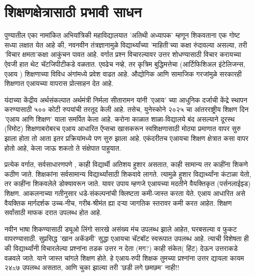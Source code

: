 \chapter{शिक्षणक्षेत्रासाठी प्रभावी साधन}

पुण्यातील एका नामांकित अभियांत्रिकी महाविद्यालयात 'अतिथी अध्यापक' म्हणून शिकवताना एक गोष्ट सध्या लक्षात येत आहे की, नवनवीन तंत्रज्ञानामुळे विद्यार्थ्यांच्या 'माहिती'च्या कक्षा रुंदावल्या असल्या, तरी 'विचार क्षमता'कक्षा आकुंचन पावत आहे. वर्गात प्रश्न विचारल्यावर उत्तर शोधण्यासाठी विचार करायच्या ऐवजी हात थेट चॅटजिपीटीकडे वळतात. एवढेच नव्हे, तर कृत्रिम बुद्धिमत्तेचा (आर्टिफिशिअल इंटेलिजन्स, एआय ) शिक्षणाच्या विविध अंगांमध्ये प्रवेश वाढत आहे. औद्योगिक आणि सामाजिक गरजांमुळे सरकारही शिक्षणात एआयच्या वापरास प्रोत्साहन देत आहे.

यंदाच्या केंद्रीय अर्थसंकल्पात अर्थमंत्री निर्मला सीतारामन यांनी 'एआय' च्या आधुनिक दर्जाची केंद्रे स्थापन करण्यासाठी ५०० कोटी रुपयांची तरतूद केली आहे. तसेच, युनेस्कोने २०२५ चा आंतरराष्ट्रीय शिक्षण दिन 'एआय आणि शिक्षण' याला समर्पित केला आहे. करोना काळात शाळा-विद्यालये बंद असल्याने दूरस्थ (रिमोट) शिक्षणाबरोबरच एआय आधारित ऍप्सचा खासकरून स्वशिक्षणासाठी मोठ्या प्रमाणात वापर सुरु झाला होता तो आता इतर प्रक्रियांमध्ये पण सुरु झाला आहे. एकंदरीतच एआयचा शिक्षण क्षेत्रात कसा वापर होतो आहे, केला जाऊ शकतो ते संक्षेपात पाहुयात.

प्रत्येक वर्गात, सर्वसाधारणपणे , काही विद्यार्थी अतिशय हुशार असतात, काही सामान्य तर काहींना शिकणे कठीण जाते. शिक्षकांना सर्वसामान्य विद्यार्थ्यांसाठी शिकवावे लागते. त्यामुळे हुशार विद्यार्थ्यांना कंटाळा येतो, तर काहींना शिकवलेले डोक्यावरून जाते. यावर उपाय म्हणजे एआयच्या मदतीने वैयक्तिकृत (पर्सनलाईझ्ड) शिक्षण. आकलनाच्या गतीनुसार धडे-संकल्पनांची क्लिष्टता कमी-जास्त करता येते. एआय आधारित असे वैयक्तिक मार्गदर्शक उच्च-नीच, गरीब-श्रीमंत ह्या दऱ्या जागतिक स्तरावर कमी करत आहेत. शिक्षण सर्वांसाठी माफक दरात उपलब्ध होत आहे.

नवीन भाषा शिकण्यासाठी ड्यूओ लिंगो सारखे असंख्य मंच उपलब्ध झाले आहेत, घरबसल्या व फुकट वापरण्यासाठी. सुप्रसिद्ध 'खान अकॅडमी' सुद्धा एआयचा चॅटबॉट स्वरूपात उपलब्ध आहे. त्याची विशेषता ही की विद्यार्थ्यांनी विचारलेल्या प्रश्नांना तडक उत्तर न देता (मग?) काही संकेत( हिंट) देऊन उत्तराकडे वळवले जाते. याने जास्त चांगले शिक्षण होते. हे एआय-रुपी शिक्षक तुमच्या प्रश्नांना उत्तर द्यायला कायम २४x७ उपलब्ध असतात, आणि चुका झाल्या तरी 'छडी लगे छमछम' नाही!!

